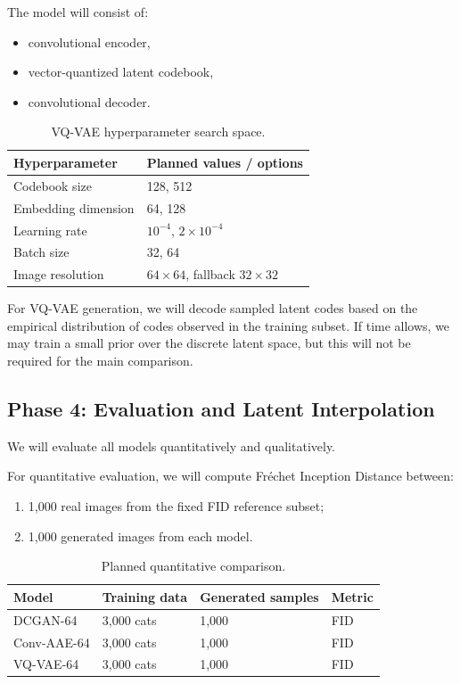 \documentclass[11pt,a4paper]{article}
\begin{document}
The model will consist of:
\begin{itemize}
    \item convolutional encoder,
    \item vector-quantized latent codebook,
    \item convolutional decoder.
\end{itemize}

\begin{table}[h]
\centering
\caption{VQ-VAE hyperparameter search space.}
\begin{tabular}{@{}ll@{}}
\toprule
\textbf{Hyperparameter} & \textbf{Planned values / options} \\ \midrule
Codebook size & 128, 512 \\
Embedding dimension & 64, 128 \\
Learning rate & $10^{-4}$, $2\times10^{-4}$ \\
Batch size & 32, 64 \\
Image resolution & $64\times64$, fallback $32\times32$ \\ \bottomrule
\end{tabular}
\end{table}

For VQ-VAE generation, we will decode sampled latent codes based on the empirical distribution of codes observed in the training subset. If time allows, we may train a small prior over the discrete latent space, but this will not be required for the main comparison.

\subsection{Phase 4: Evaluation and Latent Interpolation}
We will evaluate all models quantitatively and qualitatively.

For quantitative evaluation, we will compute Fr\'echet Inception Distance between:
\begin{enumerate}
    \item 1,000 real images from the fixed FID reference subset;
    \item 1,000 generated images from each model.
\end{enumerate}

\begin{table}[h]
\centering
\caption{Planned quantitative comparison.}
\begin{tabular}{@{}llll@{}}
\toprule
\textbf{Model} & \textbf{Training data} & \textbf{Generated samples} & \textbf{Metric} \\ \midrule
DCGAN-64 & 3,000 cats & 1,000 & FID \\
Conv-AAE-64 & 3,000 cats & 1,000 & FID \\
VQ-VAE-64 & 3,000 cats & 1,000 & FID \\ \bottomrule
\end{tabular}
\end{table}
\end{document}
